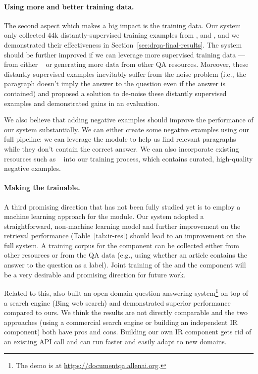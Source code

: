 \paragraph{Using more and better training data.} The second aspect which makes a big impact is the training data. Our  system only collected 44k distantly-supervised training examples from ,  and , and we demonstrated their effectiveness in Section~\ref{sec:drqa-final-results}. The system should be further improved if we can leverage more supervised training data --- from either ~\cite{joshi2017triviaqa} or generating more data from other QA resources. Moreover, these distantly supervised examples inevitably suffer from the noise problem (i.e., the paragraph doesn't imply the answer to the question even if the answer is contained) and  proposed a solution to de-noise these distantly supervised examples and demonstrated gains in an evaluation.

We also believe that adding negative examples should improve the performance of our system substantially. We can either create some negative examples using our full pipeline: we can leverage the  module to help us find relevant paragraphs while they don't contain the correct answer. We can also incorporate existing resources such as ~\cite{rajpurkar2018know} into our training process, which contains curated, high-quality negative examples.

\paragraph{Making the  trainable.} A third promising direction that has not been fully studied yet is to employ a machine learning approach for the  module. Our system adopted a straightforward, non-machine learning model and further improvement on the retrieval performance (Table~\ref{tab:ir-res}) should lead to an improvement on the full system. A training corpus for the  component can be collected either from other resources or from the QA data (e.g., using whether an article contains the answer to the question as a label). Joint training of the  and the  component will be a very desirable and promising direction for future work.

Related to this,  also built an open-domain question answering system\footnote{The demo is at \href{https://documentqa.allenai.org}{https://documentqa.allenai.org}.} on top of a search engine (Bing web search) and demonstrated superior performance compared to ours. We think the results are not directly comparable and the two approaches (using a commercial search engine or building an independent IR component) both have pros and cons. Building our own IR component gets rid of an existing API call and can run faster and easily adapt to new domains.

